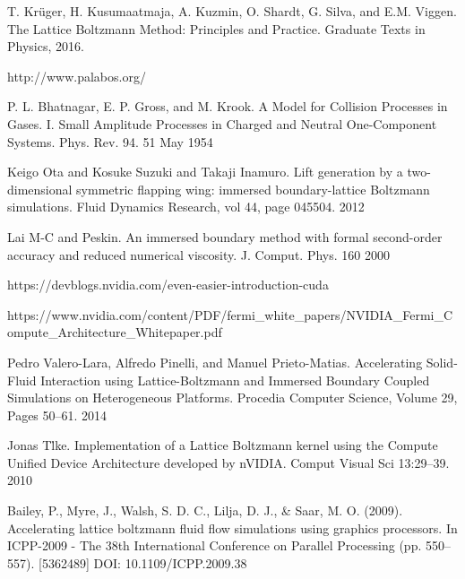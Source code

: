 \documentclass{cilamce}
\begin{document}
\begin{thebibliography}{1}
       T. Kr\"uger, H. Kusumaatmaja, A. Kuzmin, O. Shardt, G. Silva, and E.M. Viggen.  The Lattice Boltzmann Method: Principles and Practice.  Graduate Texts in Physics, 2016.

          http://www.palabos.org/

          P. L. Bhatnagar, E. P. Gross, and M. Krook. 
          A Model for Collision Processes in Gases. I. Small Amplitude Processes in Charged and Neutral One-Component Systems. 
          Phys. Rev. 94. 
          51 May 1954

          Keigo Ota and Kosuke Suzuki and Takaji Inamuro.
          Lift generation by a two-dimensional symmetric flapping wing: immersed boundary-lattice Boltzmann simulations.
          Fluid Dynamics Research, vol 44, page 045504.
          2012

          Lai M-C and Peskin. 
          An immersed boundary method with formal second-order accuracy and reduced numerical viscosity.
          J. Comput. Phys. 160
          2000

          https://devblogs.nvidia.com/even-easier-introduction-cuda

          https://www.nvidia.com/content/PDF/fermi\_white\_papers/NVIDIA\_Fermi\_Compute\_Architecture\_Whitepaper.pdf

          Pedro Valero-Lara, Alfredo Pinelli, and Manuel Prieto-Matias.
          Accelerating Solid-Fluid Interaction using Lattice-Boltzmann and Immersed Boundary Coupled Simulations on Heterogeneous Platforms.
          Procedia Computer Science, Volume 29, Pages 50--61.
          2014

          Jonas T\"lke.
          Implementation of a Lattice Boltzmann kernel using the Compute Unified Device Architecture developed by nVIDIA. 
          Comput Visual Sci 13:29--39.
          2010

          Bailey, P., Myre, J., Walsh, S. D. C., Lilja, D. J., \& Saar, M. O. (2009).
          Accelerating lattice boltzmann fluid flow simulations using graphics processors.
          In ICPP-2009 - The 38th International Conference on Parallel Processing (pp. 550--557). [5362489] DOI: 10.1109/ICPP.2009.38

\end{thebibliography}

\end{document}
